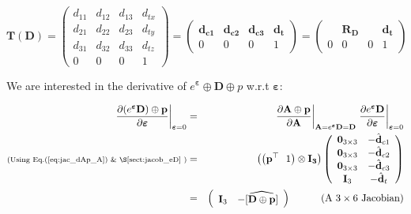 \documentclass[a4paper,11pt]{report}
\newcommand{\E}{{\bm{\varepsilon}}}
\begin{document}
\begin{equation}
\mathbf{T}(\mathbf{D}) =
\left(
\begin{array}{ccc|c}
 d_{11} & d_{12} & d_{13} & d_{tx}   \\
 d_{21} & d_{22} & d_{23} & d_{ty}   \\
 d_{31} & d_{32} & d_{33} & d_{tz}   \\
\hline
  0 & 0 & 0 & 1
\end{array}
\right)
=
\left(
\begin{array}{ccc|c}
 \mathbf{d_{c1}}  & \mathbf{d_{c2}}  & \mathbf{d_{c3}}  & \mathbf{d_{t}}  \\
\hline
  0 & 0 & 0 & 1
\end{array}
\right)
=
\left(
\begin{array}{ccc|c}
   & \mathbf{R_D}  &  & \mathbf{d_{t}}  \\
\hline
  0 & 0 & 0 & 1
\end{array}
\right)
\end{equation}

We are interested in the derivative of $e^\E \oplus \mathbf{D} \oplus p$ w.r.t $\E$:

\begin{eqnarray}
\left. \frac{\partial (e^\E \mathbf{D}) \oplus \mathbf{p} }{\partial \E} \right|_{\E = 0}
&=&
\left. \frac{\partial \mathbf{A} \oplus \mathbf{p}}{\partial \mathbf{A} } \right|_{\mathbf{A}=e^\E \mathbf{D} = \mathbf{D}}
\left. \frac{\partial e^\E \mathbf{D}}{\partial \E} \right|_{\E=0}
\\
\text{\scriptsize{(Using Eq.(\ref{eq:jac_dAp_A}) \& \S\ref{sect:jacob_eD}} )} &=&
\left(\left( \mathbf{p}^\top ~~ 1 \right) \otimes \mathbf{I_3} \right)
\left(
\begin{array}{cc}
 \mathbf{0}_{3\times 3}  & -\hat{\mathbf{d}}_{c1} \\
 \mathbf{0}_{3\times 3}  & -\hat{\mathbf{d}}_{c2} \\
 \mathbf{0}_{3\times 3}  & -\hat{\mathbf{d}}_{c3} \\
 \mathbf{I}_{3}  & -\hat{\mathbf{d}}_{t} \\
\end{array}
\right)
\\
\label{eq:jacob_eDp_e}
&=&
\left(
\begin{array}{cc}
 \mathbf{I}_3   & - \widehat{ \left[ \mathbf{D} \oplus \mathbf{p} \right]}
\end{array}
\right)
\quad\quad\quad \text{(A $3 \times 6$ Jacobian)}
\end{eqnarray}
\end{document}
